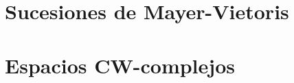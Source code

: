 


%





\mainmatter %



\part{Sucesiones de Mayer-Vietoris}



\part{Espacios CW-complejos}



%
%
%

%
%

